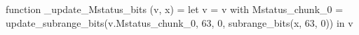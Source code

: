 function _update_Mstatus_bits (v, x) = let v = { v with Mstatus_chunk_0 = update_subrange_bits(v.Mstatus_chunk_0, 63, 0, subrange_bits(x, 63, 0)) } in
  v
